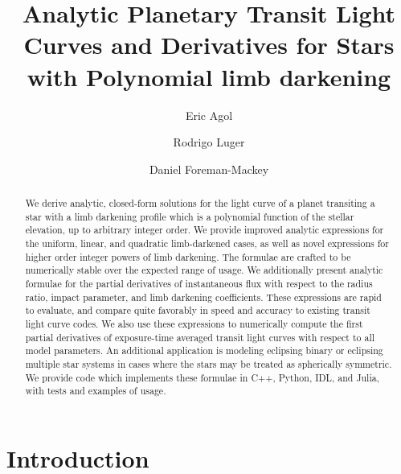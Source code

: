 \documentclass[modern]{aastex61}
\begin{document}

\setlength{\abovedisplayskip}{1.5em}
\setlength{\belowdisplayskip}{1.5em}

\title{%
Analytic Planetary Transit Light Curves and Derivatives for Stars with Polynomial limb darkening
}


\author[0000-0002-0802-9145]{Eric Agol}
\author[0000-0002-0296-3826]{Rodrigo Luger}
\author[0000-0002-9328-5652]{Daniel Foreman-Mackey}


\begin{abstract}
 We derive analytic, closed-form solutions for the light curve of a planet
 transiting a star with a limb darkening profile which is a polynomial function
 of the stellar elevation, up to arbitrary integer order.
 We provide improved analytic expressions for the uniform, linear, and quadratic
 limb-darkened cases, as well as novel expressions for higher order integer powers
 of limb darkening.  The formulae are crafted to be numerically stable over the
 expected range of usage.  We additionally present analytic formulae for
 the partial derivatives of instantaneous flux with respect to the radius ratio,
 impact parameter, and limb darkening coefficients.  These expressions are rapid to
 evaluate, and compare quite favorably in speed and accuracy to existing transit light
 curve codes. We also use these expressions to numerically compute the first partial
 derivatives of exposure-time averaged transit light curves with respect to all
 model parameters.  An additional application is modeling eclipsing binary or
 eclipsing multiple star systems in cases where the stars may be treated as spherically
 symmetric.  We provide code which implements these formulae in C++, Python, IDL, and Julia,
 with tests and examples of usage.
\end{abstract}

%
\section{Introduction}
\label{sec:intro}
\end{document}

